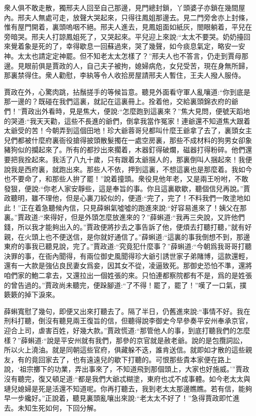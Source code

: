 \begin{parag}
    衆人俱不敢走散，獨邢夫人回至自己那邊，見門總封鎖，丫頭婆子亦鎖在幾間屋內。邢夫人無處可走，放聲大哭起來，只得往鳳姐那邊去。見二門旁舍亦上封條，惟有屋門開着，裏頭嗚咽不絕。邢夫人進去，見鳳姐面如紙灰，閤眼躺着，平兒在旁暗哭。邢夫人打諒鳳姐死了，又哭起來。平兒迎上來說:“太太不要哭。奶奶擡回來覺着象是死的了，幸得歇息一回蘇過來，哭了幾聲，如今痰息氣定，略安一安神。太太也請定定神罷。但不知老太太怎樣了？”邢夫人也不答言，仍走到賈母那邊。見眼前俱是賈政的人，自己夫子被拘，媳婦病危，女兒受苦，現在身無所歸，那裏禁得住。衆人勸慰，李紈等令人收拾房屋請邢夫人暫住，王夫人撥人服侍。
\end{parag}


\begin{parag}
    賈政在外，心驚肉跳，拈鬚搓手的等候旨意。聽見外面看守軍人亂嚷道:“你到底是那一邊的？既碰在我們這裏，就記在這裏冊上。拴着他，交給裏頭錦衣府的爺們！”賈政出外看時，見是焦大，便說:“怎麼跑到這裏來？”焦大見問，便號天蹈地的哭道:“我天天勸，這些不長進的爺們，倒拿我當作冤家！連爺還不知道焦大跟着太爺受的苦！今朝弄到這個田地！珍大爺蓉哥兒都叫什麼王爺拿了去了，裏頭女主兒們都被什麼府裏衙役搶得披頭散髮擉在一處空房裏，那些不成材料的狗男女卻象豬狗似的攔起來了。所有的都抄出來擱着，木器釘得破爛，磁器打得粉碎。他們還要把我拴起來。我活了八九十歲，只有跟着太爺捆人的，那裏倒叫人捆起來！我便說我是西府裏，就跑出來。那些人不依，押到這裏，不想這裏也是那麼着。我如今也不要命了，和那些人拚了罷！”說着撞頭。衆役見他年老，又是兩王吩咐，不敢發狠，便說:“你老人家安靜些，這是奉旨的事。你且這裏歇歇，聽個信兒再說。”賈政聽明，雖不理他，但是心裏刀絞似的，便道:“完了，完了！不料我們一敗塗地如此！”正在着急聽候內信，只見薛蝌氣噓噓的跑進來說:“好容易進來了！姨父在那裏。”賈政道:“來得好，但是外頭怎麼放進來的？”薛蝌道:“我再三央說，又許他們錢，所以我才能夠出入的。”賈政便將抄去之事告訴了他，便煩去打聽打聽，”就有好親，在火頭上也不便送信，是你就好通信了。”薛蝌道:“這裏的事我倒想不到，那邊東府的事我已聽見說，完了。”賈政道:“究竟犯什麼事？”薛蝌道:“今朝爲我哥哥打聽決罪的事，在衙內聞得，有兩位御史風聞得珍大爺引誘世家子弟賭博，這款還輕，還有一大款是強佔良民妻女爲妾，因其女不從，凌逼致死。那御史恐怕不準，還將咱們家的鮑二拿去，又還拉出一個姓張的來。只怕連都察院都有不是，爲的是姓張的曾告過的。”賈政尚未聽完，便跺腳道:“了不得！罷了，罷了！”嘆了一口氣，撲簌簌的掉下淚來。
\end{parag}


\begin{parag}
    薛蝌寬慰了幾句，即便又出來打聽去了。隔了半日，仍舊進來說:“事情不好。我在刑科打聽，倒沒有聽見兩王復旨的信，但聽得說李御史今早參奏平安州奉承京官，迎合上司，虐害百姓，好幾大款。”賈政慌道:“那管他人的事，到底打聽我們的怎麼樣？”薛蝌道:“說是平安州就有我們，那參的京官就是赦老爺。說的是包攬詞訟，所以火上澆油。就是同朝這些官府，俱藏躲不迭，誰肯送信。就即如才散的這些親友，有的竟回家去了，也有遠遠兒的歇下打聽的。可恨那些貴本家便在路上說，‘祖宗擲下的功業，弄出事來了，不知道飛到那個頭上，大家也好施威。’”賈政沒有聽完，復又頓足道:“都是我們大爺忒糊塗，東府也忒不成事體。如今老太太與璉兒媳婦是死是活還不知道呢。你再打聽去，我到老太太那邊瞧瞧。若有信，能夠早一步纔好。”正說着，聽見裏頭亂嚷出來說:“老太太不好了！”急得賈政即忙進去。未知生死如何，下回分解。
\end{parag}
